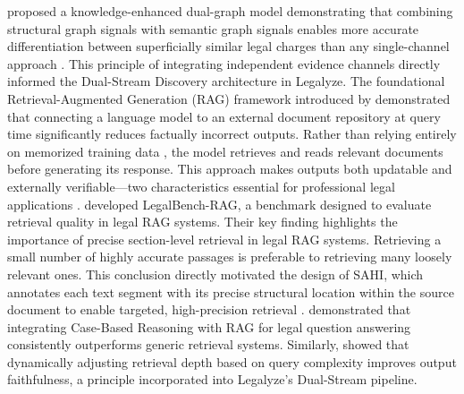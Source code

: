 \documentclass[a4paper,fleqn]{cas-dc}
\begin{document}
\citet{2} proposed a knowledge-enhanced dual-graph model demonstrating that combining structural graph signals with semantic graph signals enables more accurate differentiation between superficially similar legal charges than any single-channel approach \citep{21}. This principle of integrating independent evidence channels directly informed the Dual-Stream Discovery architecture in Legalyze. The foundational Retrieval-Augmented Generation (RAG) framework introduced by \citet{15} demonstrated that connecting a language model to an external document repository at query time significantly reduces factually incorrect outputs. Rather than relying entirely on memorized training data \citep{22}, the model retrieves and reads relevant documents before generating its response. This approach makes outputs both updatable and externally verifiable—two characteristics essential for professional legal applications \citep{23}. \citet{20} developed LegalBench-RAG, a benchmark designed to evaluate retrieval quality in legal RAG systems. Their key finding highlights the importance of precise section-level retrieval in legal RAG systems. Retrieving a small number of highly accurate passages is preferable to retrieving many loosely relevant ones. This conclusion directly motivated the design of SAHI, which annotates each text segment with its precise structural location within the source document to enable targeted, high-precision retrieval \citep{24}. \citet{25} demonstrated that integrating Case-Based Reasoning with RAG for legal question answering consistently outperforms generic retrieval systems. Similarly, \citet{12} showed that dynamically adjusting retrieval depth based on query complexity improves output faithfulness, a principle incorporated into Legalyze’s Dual-Stream pipeline.
\end{document}

